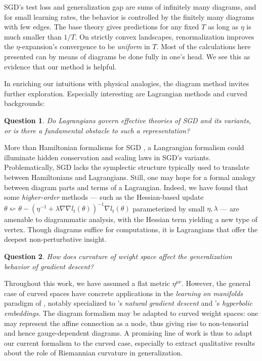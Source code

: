 \documentclass{article}
\newtheorem{quest}{Question}
\begin{document}
    SGD's test loss and generalization gap are sums of infinitely many
    diagrams, and for small learning rates, the behavior is controlled by the
    finitely many diagrams with few edges.  The base theory gives predictions
    for any fixed $T$ as long as $\eta$ is much smaller than $1/T$.  On
    strictly convex landscapes, renormalization improves the $\eta$-expansion's
    convergence to be \emph{uniform} in $T$.  Most of the calculations here
    presented can by means of diagrams be done fully in one's head.  We see
    this as evidence that our method is helpful.


    In enriching our intuitions with physical analogies, the diagram method
    invites further exploration.  Especially interesting are Lagrangian methods
    and curved backgrounds: 
    \begin{quest}
        Do Lagrangians govern effective theories of SGD and its variants, or
        is there a fundamental obstacle to such a representation?
    \end{quest}
        More than Hamiltonian formalisms for SGD \cite{ch14}, a Langrangian
        formalism could illuminate hidden conservation and scaling laws in
        SGD's variants.  Problematically, SGD lacks the symplectic structure
        typically used to translate between Hamiltonians and Lagrangians.
        Still, one may hope for a formal analogy between diagram parts and
        terms of a Lagrangian.  Indeed, we have found that some
        \emph{higher-order} methods --- such as the Hessian-based update
        $
            \theta \leftsquigarrow
            \theta -
            (\eta^{-1} + \lambda \nabla \nabla l_t(\theta))^{-1}
            \nabla l_t(\theta)
        $
        parameterized by small $\eta, \lambda$ --- are amenable to diagrammatic
        analysis, with the Hessian term yielding a new type of vertex.
        Though diagrams suffice for computations, it is Lagrangians that offer
        the deepest non-perturbative insight.
    \begin{quest}
        How does curvature of weight space affect the generalization behavior
        of gradient descent?
    \end{quest}
        Throughout this work, we have assumed a flat metric $\eta^{\mu\nu}$.
        However, the general case of curved spaces have concrete applications
        in the \emph{learning on manifolds} paradigm of \citet{bo13}, notably
        specialized to \citet{am98}'s \emph{natural gradient descent} and
        \citet{ni17}'s \emph{hyperbolic embeddings}.  The diagram formalism may
        be adapted to curved weight spaces: one may represent the affine
        connection as a node, thus giving rise to non-tensorial and hence
        gauge-dependent diagrams.  A promising line of work is thus to adapt
        our current formalism to the curved case, especially to extract
        qualitative results about the role of Riemannian curvature in
        generalization.
\end{document}
